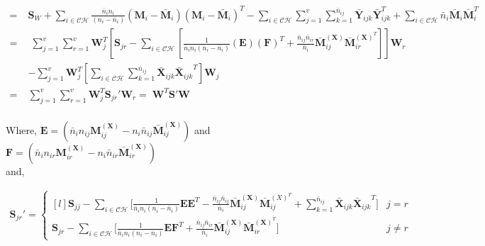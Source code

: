 \begin{equation*}
\begin{split}
\\
= \; & \textbf{S}_W + \sum\limits_{i \in \mathcal{CH}} \frac{\bar{n}_i n_i}{(n_i - \bar{n}_i)} \left( \textbf{M}_i - \bar{\textbf{M}}_i \right) \left( \textbf{M}_i - \bar{\textbf{M}}_i \right)^T - \sum\limits_{i \in \mathcal{CH}} \sum\limits_{j=1}^{v} \sum\limits_{k=1}^{\bar{n}_{ij}} \bar{\textbf{Y}}_{ijk} \bar{\textbf{Y}}_{ijk}^T + \sum\limits_{i \in \mathcal{CH}} \bar{n}_i \bar{\textbf{M}}_{i} \bar{\textbf{M}}_i^T
\\
= & \; \sum\limits_{j=1}^{v} \sum\limits_{r=1}^{v} \textbf{W}_j^T \left[ \textbf{S}_{jr} - \sum\limits_{i \in \mathcal{CH}} \left[ \frac{1}{\bar{n}_i n_i (n_i - \bar{n}_i)} \left( \textbf{E} \right) \left( \textbf{F} \right)^T + \frac{\bar{n}_{ij} \bar{n}_{ir}}{\bar{n}_i} \bar{\textbf{M}}_{ij}^{(\textbf{X})} \bar{\textbf{M}}_{ir}^{(\textbf{X})^T} \right] \right] \textbf{W}_r \\
& - \sum\limits_{j=1}^{v} \textbf{W}_j^T \left[ \sum\limits_{i \in \mathcal{CH}} \sum\limits_{k=1}^{\bar{n}_{ij}} \bar{\textbf{X}}_{ijk} {\bar{\textbf{X}}_{ijk}}^T \right] \textbf{W}_j \\
= & \sum\limits_{j=1}^{v} \sum\limits_{r=1}^{v} \textbf{W}_j^T \textbf{S}_{jr}' \textbf{W}_r = \; \textbf{W}^T \textbf{S}' \textbf{W} \\
\end{split}
\end{equation*}

\normalsize
\noindent
Where, $\textbf{E} = ( \bar{n}_i n_{ij} \textbf{M}_{ij}^{(\textbf{X})} - n_i \bar{n}_{ij} \bar{\textbf{M}}_{ij}^{(\textbf{X})} )$ and $\textbf{F} = ( \bar{n}_i n_{ir} \textbf{M}_{ir}^{(\textbf{X})} - n_i \bar{n}_{ir} \bar{\textbf{M}}_{ir}^{(\textbf{X})} )$\\

\noindent
and,

\begin{equation*}
\begin{split}
\textbf{S}_{jr}' = \left\{\begin{matrix*}[l]
\textbf{S}_{jj} - \sum\limits_{i \in \mathcal{CH}} \bigg[ \frac{1}{\bar{n}_i n_i (n_i - \bar{n}_i)} \textbf{E} \textbf{E}^T - \frac{\bar{n}_{ij} \bar{n}_{ij}}{\bar{n}_i} \bar{\textbf{M}}_{ij}^{(\textbf{X})} \bar{\textbf{M}}_{ij}^{(X)^T} + \sum\limits_{k=1}^{\bar{n}_{ij}} \bar{\textbf{X}}_{ijk} {\bar{\textbf{X}}_{ijk}}^T \bigg] & j=r \\[0.4cm]
\textbf{S}_{jr} - \sum\limits_{i \in \mathcal{CH}} \bigg[ \frac{1}{\bar{n}_i n_i (n_i - \bar{n}_i)} \textbf{E} \textbf{F}^T + \frac{\bar{n}_{ij} \bar{n}_{ir}}{\bar{n}_i} \bar{\textbf{M}}_{ij}^{(\textbf{X})} \bar{\textbf{M}}_{ir}^{(\textbf{X})^T} \bigg] & j \neq r
\end{matrix*}\right.
\end{split}
\end{equation*}












